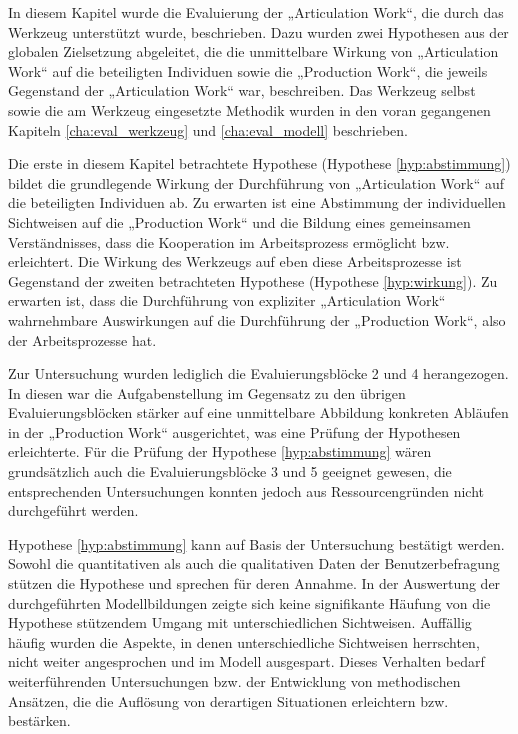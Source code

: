 In diesem Kapitel wurde die Evaluierung der „Articulation Work“, die durch das Werkzeug unterstützt wurde, beschrieben. Dazu wurden zwei Hypothesen aus der globalen Zielsetzung abgeleitet, die die unmittelbare Wirkung von „Articulation Work“ auf die beteiligten Individuen sowie die „Production Work“, die jeweils Gegenstand der „Articulation Work“ war, beschreiben. Das Werkzeug selbst sowie die am Werkzeug eingesetzte Methodik wurden in den voran gegangenen Kapiteln \ref{cha:eval_werkzeug} und \ref{cha:eval_modell} beschrieben.

Die erste in diesem Kapitel betrachtete Hypothese (Hypothese \ref{hyp:abstimmung}) bildet die grundlegende Wirkung der Durchführung von „Articulation Work“ auf die beteiligten Individuen ab. Zu erwarten ist eine Abstimmung der individuellen Sichtweisen auf die „Production Work“ und die Bildung eines gemeinsamen Verständnisses, dass die Kooperation im Arbeitsprozess ermöglicht bzw. erleichtert. Die Wirkung des Werkzeugs auf eben diese Arbeitsprozesse ist Gegenstand der zweiten betrachteten Hypothese (Hypothese \ref{hyp:wirkung}). Zu erwarten ist, dass die Durchführung von expliziter „Articulation Work“ wahrnehmbare Auswirkungen auf die Durchführung der „Production Work“, also der Arbeitsprozesse hat.

Zur Untersuchung wurden lediglich die Evaluierungsblöcke 2 und 4 herangezogen. In diesen war die Aufgabenstellung im Gegensatz zu den übrigen Evaluierungsblöcken stärker auf eine unmittelbare Abbildung konkreten Abläufen in der „Production Work“ ausgerichtet, was eine Prüfung der Hypothesen erleichterte. Für die Prüfung der Hypothese \ref{hyp:abstimmung} wären grundsätzlich auch die Evaluierungsblöcke 3 und 5 geeignet gewesen, die entsprechenden Untersuchungen konnten jedoch aus Ressourcengründen nicht durchgeführt werden.

Hypothese \ref{hyp:abstimmung} kann auf Basis der Untersuchung bestätigt werden. Sowohl die quantitativen als auch die qualitativen Daten der Benutzerbefragung stützen die Hypothese und sprechen für deren Annahme. In der Auswertung der durchgeführten Modellbildungen zeigte sich keine signifikante Häufung von die Hypothese stützendem Umgang mit unterschiedlichen Sichtweisen. Auffällig häufig wurden die Aspekte, in denen unterschiedliche Sichtweisen herrschten, nicht weiter angesprochen und im Modell ausgespart. Dieses Verhalten bedarf weiterführenden Untersuchungen bzw. der Entwicklung von methodischen Ansätzen, die die Auflösung von derartigen Situationen erleichtern bzw. bestärken.

